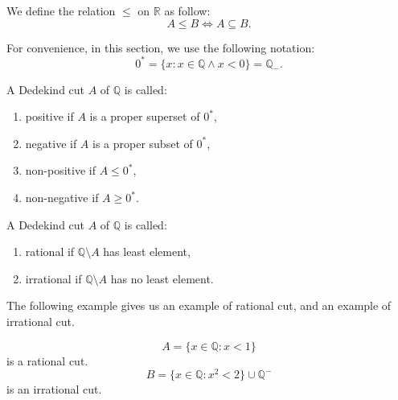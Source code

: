 We define the relation $\le$ on $\mathbb{R}$ as follow:
\[
    A\le B \Longleftrightarrow A\subseteq B.
\]

For convenience, in this section, we use the following notation:
\[
    {0}^{*} = \{ x : x\in\mathbb{Q} \wedge x < 0 \} = {\mathbb{Q}}_{-}.
\]

\begin{definition}
    A Dedekind cut $A$ of $\mathbb{Q}$ is called:
    \begin{enumerate}[label={(\roman*)}]
        \item positive if $A$ is a proper superset of ${0}^{*}$,
        \item negative if $A$ is a proper subset of ${0}^{*}$,
        \item non-positive if $A\le {0}^{*}$,
        \item non-negative if $A\ge {0}^{*}$.
    \end{enumerate}
\end{definition}

\begin{definition}
    A Dedekind cut $A$ of $\mathbb{Q}$ is called:
    \begin{enumerate}[label={(\roman*)}]
        \item rational if $\mathbb{Q}\setminus A$ has least element,
        \item irrational if $\mathbb{Q}\setminus A$ has no least element.
    \end{enumerate}
\end{definition}

The following example gives us an example of rational cut, and an example of irrational cut.

\begin{example}
    \[
        A = \{ x\in\mathbb{Q}: x < 1 \}
    \]
    is a rational cut.
    \[
        B = \{ x\in\mathbb{Q}: {x}^{2} < 2 \} \cup \mathbb{Q}^{-}
    \]
    is an irrational cut.
\end{example}

